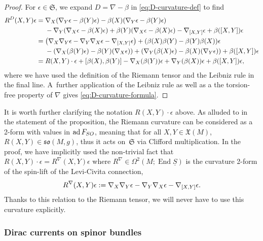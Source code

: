 \documentclass[11pt]{article}
\numberwithin{equation}{section}
\numberwithin{equation}{section}
\newcommand{\fso}{\mathfrak{so}}
\newcommand{\fX}{\mathfrak{X}}
\newcommand{\fS}{\mathfrak{S}}
\newcommand{\Sbundle}{\underline{S}}
\newcommand{\1}{\mathbbm{1}}
\DeclareMathOperator{\End}{End}
\DeclareMathOperator{\ad}{ad}
\begin{document}
\begin{proof}
	For $\epsilon\in\fS$, we expand $D=\nabla-\beta$ in \eqref{eq:D-curvature-def} to find
	\begin{align*}
		 R^D(X,Y)\epsilon	
			={}& \nabla_X(\nabla_Y\epsilon-\beta(Y)\epsilon) - \beta(X)(\nabla_Y\epsilon-\beta(Y)\epsilon)	\\
				& - \nabla_Y(\nabla_X\epsilon-\beta(X)\epsilon) + \beta(Y)(\nabla_X\epsilon-\beta(X)\epsilon)
				- \nabla_{\comm{X}{Y}}\epsilon + \beta({\comm{X}{Y}})\epsilon	\\
			={}& \qty(\nabla_X\nabla_Y\epsilon - \nabla_Y\nabla_X\epsilon - \nabla_{\comm{X}{Y}}\epsilon)
				+ \qty(\beta(X)\beta(Y)-\beta(Y)\beta(X))\epsilon	\\
				& - \qty(\nabla_X(\beta(Y)\epsilon)-\beta(Y)(\nabla_X\epsilon)) + \qty(\nabla_Y(\beta(X)\epsilon)
				- \beta(X)(\nabla_Y\epsilon)) + \beta({\comm{X}{Y}})\epsilon \\
			={}& R(X,Y)\cdot\epsilon + \comm{\beta(X)}{\beta(Y)} - \nabla_X(\beta(Y))\epsilon + \nabla_Y(\beta(X))\epsilon + \beta({\comm{X}{Y}})\epsilon,
	\end{align*}
	where we have used the definition of the Riemann tensor and the Leibniz rule in the final line. A~further application of the Leibniz rule as well as a the torsion-free property of $\nabla$ gives \eqref{eq:D-curvature-formula}.
\end{proof}

\begin{Remark}\label{rem:riemann-spinor-action}
	It is worth further clarifying the notation $R(X,Y)\cdot\epsilon$ above. As alluded to in the statement of the proposition, the Riemann curvature can be considered as a 2-form with values in $\ad F_{\rm SO}$, meaning that for all $X,Y\in \fX(M)$, $R(X,Y)\in\fso(M,g)$, thus it acts on~$\fS$ via Clifford multiplication. In the proof, we have implicitly used the non-trivial fact that~${R(X,Y)\cdot\epsilon=R^\nabla(X,Y)\epsilon}$ where $R^\nabla\in\Omega^2(M;\End \Sbundle)$ is the curvature 2-form of the spin-lift of the Levi-Civita connection,
\[
R^\nabla(X,Y)\epsilon:=\nabla_X\nabla_Y\epsilon-\nabla_Y\nabla_X\epsilon-\nabla_{\comm{X}{Y}}\epsilon.
\]
Thanks to this relation to the Riemann tensor, we will never have to use this curvature explicitly.
\end{Remark}

\subsubsection{Dirac currents on spinor bundles}
\label{sec:dirac-current-bundle}
\end{document}
